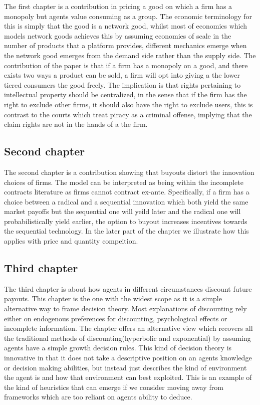 \documentclass[12pt]{article}
\numberwithin{equation}{section}
\begin{document}
The first chapter is a contribution in pricing a good on which a firm has a monopoly but agents value consuming as a group. The economic terminology for this is simply that the good is a network good, whilst most of economics which models network goods achieves this by assuming economies of scale in the number of products that a platform provides, different mechanics emerge when the network good emerges from the demand side rather than the supply side. The contribution of the paper is that if a firm has a monopoly on a good, and there exists two ways a product can be sold, a firm will opt into giving a the lower tiered consumers the good freely. The implication is that rights pertaining to intellectual property should be centralized, in the sense that if the firm has the right to exclude other firms, it should also have the right to exclude users, this is contrast to the courts which treat piracy as a criminal offense, implying that the claim rights are not in the hands of a the firm.


\subsection{Second chapter}

The second chapter is a contribution showing that buyouts distort the innovation choices of firms. The model can be interpreted as being within the incomplete contracts literature as firms cannot contract ex-ante. Specifically, if a firm has a choice between a radical and a sequential innovation which both yield the same market payoffs but the sequential one will yeild later and the radical one will probabilistically yield earlier, the option to buyout increases incentives towards the sequential technology. In the later part of the chapter we illustrate how this applies with price and quantity compeition.

 \subsection{Third chapter}

The third chapter is about how agents in different circumstances discount future payouts. This chapter is the one with the widest scope as it is a simple alternative way to frame decision theory. Most explanations of discounting rely either on endogenous preferences for discounting, psychological effects or incomplete information. The chapter offers an alternative view which recovers all the traditional methods of discounting(hyperbolic and exponential) by assuming agents have a simple growth decision rules. This kind of decision theory is innovative in that it does not take a descriptive position on an agents knowledge or decision making abilities, but instead just describes the kind of environment the agent is and how that environment can best exploited. This is an example of the kind of heuristics that can emerge if we consider moving away from frameworks which are too reliant on agents ability to deduce.
\end{document}
